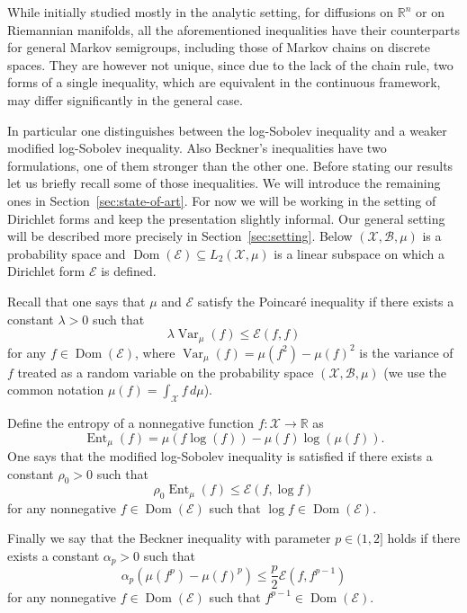 \documentclass[a4paper]{amsart}
\theoremstyle{definition}
\theoremstyle{remark}
\numberwithin{equation}{section}
\newcommand*{\RR}{\mathbb{R}}
\newcommand{\calX}{\mathcal{X}}
\newcommand{\calB}{\mathcal{B}}
\DeclareMathOperator{\Dom}{Dom} %
\newcommand*{\calE}{\mathcal{E}}
\DeclareMathOperator{\Ent}{Ent}	%
\DeclareMathOperator{\Var}{Var}	%
\begin{document}
While initially studied mostly in the analytic setting, for diffusions on $\RR^n$ or on Riemannian manifolds, all the aforementioned inequalities have their counterparts for general Markov semigroups, including those of Markov chains on discrete spaces.
They are however not unique, since due to the lack of the chain rule, two forms of a single inequality, which are equivalent in the continuous framework, may differ significantly in the general case.

In particular one distinguishes between the log-Sobolev inequality and a weaker modified log-Sobolev inequality.
Also Beckner's inequalities have two formulations, one of them stronger than the other one.
Before stating our results let us briefly recall some of those inequalities.
We will introduce the remaining ones in Section~\ref{sec:state-of-art}.
For now we will be working in the setting of Dirichlet forms and keep the presentation slightly informal.
Our general setting will be described more precisely in Section~\ref{sec:setting}.
Below $(\mathcal{X},\mathcal{B},\mu)$ is a probability space and $\Dom(\calE) \subseteq L_2(\mathcal{X},\mu)$ is a linear subspace on which a Dirichlet form $\calE$ is defined.

Recall that one says that $\mu$ and $\calE$ satisfy the Poincar\'{e} inequality if there exists a constant $\lambda>0$ such that
\begin{equation}
\label{eq:Poinc-intro}
	\lambda\Var_\mu(f) \le \calE(f,f)	
\end{equation}
for any $f\in \Dom(\calE)$, where $\Var_\mu (f) = \mu(f^2) - \mu(f)^2$ is the variance of $f$ treated as a random variable on the probability space $(\calX,\calB,\mu)$ (we use the common notation $\mu(f)=\int_\calX f\,d\mu$).

Define the entropy of a nonnegative function $f\colon \calX\to \RR$ as
\begin{displaymath}
\Ent_\mu(f) = \mu(f\log(f)) - \mu(f)\log(\mu(f)).
\end{displaymath}
One says that the  modified log-Sobolev inequality is satisfied if there exists a constant $\rho_0>0$ such that
\begin{equation}
 \label{eq:mlS-log-intro}
 \rho_0 \Ent_\mu(f)\leq \calE(f,\log f)
\end{equation}
for any  nonnegative $f\in \Dom(\calE)$ such that $\log f\in \Dom(\calE)$.



Finally we say that the Beckner inequality
with parameter $p\in(1,2]$ holds if there exists a constant $\alpha_p>0$ such that
\begin{equation}
 \label{eq:Beckner-GJ-intro}
 \alpha_p( \mu(f^p) - \mu(f)^p) \leq \frac{p}{2} \calE(f,f^{p-1})
\end{equation}
for any nonnegative $f\in \Dom(\calE)$ such that $f^{p-1}\in \Dom(\calE)$.
\end{document}
